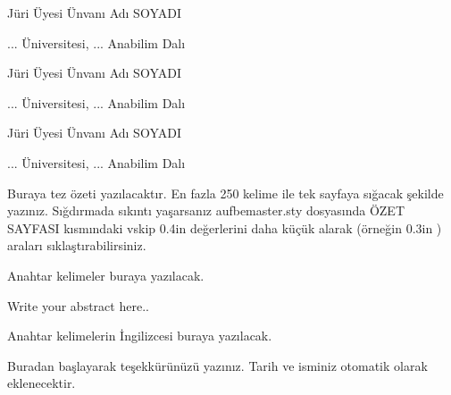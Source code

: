 \documentclass[12pt,a4paper,turkish]{book}
\begin{document}
\begin{juric}
Jüri Üyesi Ünvanı Adı SOYADI

\hspace{2cm}... Üniversitesi, ... Anabilim Dalı 
\end{juric}

\begin{jurid}
Jüri Üyesi Ünvanı Adı SOYADI

\hspace{2cm}... Üniversitesi, ... Anabilim Dalı 
\end{jurid}

\begin{jurie}
Jüri Üyesi Ünvanı Adı SOYADI

\hspace{2cm}... Üniversitesi, ... Anabilim Dalı 
\end{jurie}

\begin{tezozet}
{\small Buraya tez özeti yazılacaktır. En fazla 250 kelime ile
tek sayfaya sığacak şekilde yazınız. Sığdırmada sıkıntı yaşarsanız aufbemaster.sty dosyasında ÖZET SAYFASI kısmındaki \TEXTsymbol{\backslash}vskip 0.4in değerlerini daha küçük alarak (örneğin 0.3in ) araları sıklaştırabilirsiniz. }
\end{tezozet}

\begin{anahtarkelime}
{\small Anahtar kelimeler buraya yazılacak.}
\end{anahtarkelime}

\begin{tezozeting}
{\small Write your abstract here.. }
\end{tezozeting}

\begin{keyword}
{\small Anahtar kelimelerin \.{I}ngilizcesi buraya yaz\i lacak. }
\end{keyword}

\begin{tsk}
Buradan başlayarak teşekkürünüzü yazınız. Tarih ve isminiz otomatik olarak eklenecektir. 

\end{tsk}

\begin{sayfa}
\pageref{son}
\end{sayfa}

\begin{kapaksayfa}
\end{kapaksayfa}

\onaydok %
\begin{etik}
\end{etik}
\end{document}
